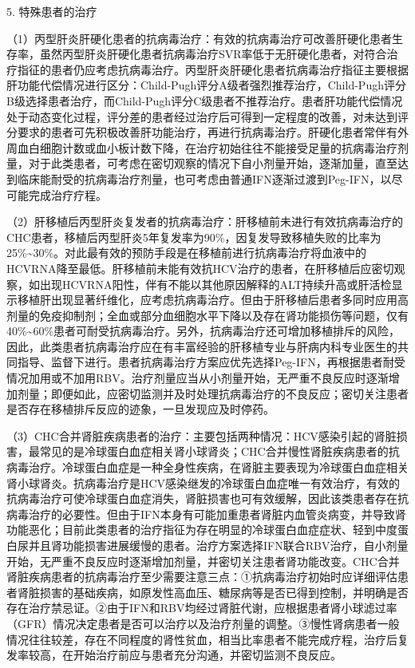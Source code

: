 5. 特殊患者的治疗

（1）丙型肝炎肝硬化患者的抗病毒治疗：有效的抗病毒治疗可改善肝硬化患者生存率，虽然丙型肝炎肝硬化患者抗病毒治疗SVR率低于无肝硬化患者，对符合治疗指征的患者仍应考虑抗病毒治疗。丙型肝炎肝硬化患者抗病毒治疗指征主要根据肝功能代偿情况进行区分：Child-Pugh评分A级者强烈推荐治疗，Child-Pugh评分B级选择患者治疗，而Child-Pugh评分C级患者不推荐治疗。患者肝功能代偿情况处于动态变化过程，评分差的患者经过治疗后可得到一定程度的改善，对未达到评分要求的患者可先积极改善肝功能治疗，再进行抗病毒治疗。肝硬化患者常伴有外周血白细胞计数或血小板计数下降，在治疗初始往往不能接受足量的抗病毒治疗剂量，对于此类患者，可考虑在密切观察的情况下自小剂量开始，逐渐加量，直至达到临床能耐受的抗病毒治疗剂量，也可考虑由普通IFN逐渐过渡到Peg-IFN，以尽可能完成治疗疗程。

（2）肝移植后丙型肝炎复发者的抗病毒治疗：肝移植前未进行有效抗病毒治疗的CHC患者，移植后丙型肝炎5年复发率为90\%，因复发导致移植失败的比率为25\%\textasciitilde{}30\%。对此最有效的预防手段是在移植前进行抗病毒治疗将血液中的HCVRNA降至最低。肝移植前未能有效抗HCV治疗的患者，在肝移植后应密切观察，如出现HCVRNA阳性，伴有不能以其他原因解释的ALT持续升高或肝活检显示移植肝出现显著纤维化，应考虑抗病毒治疗。但由于肝移植后患者多同时应用高剂量的免疫抑制剂；全血或部分血细胞水平下降以及存在肾功能损伤等问题，仅有40\%\textasciitilde{}60\%患者可耐受抗病毒治疗。另外，抗病毒治疗还可增加移植排斥的风险，因此，此类患者抗病毒治疗应在有丰富经验的肝移植专业与肝病内科专业医生的共同指导、监督下进行。患者抗病毒治疗方案应优先选择Peg-IFN，再根据患者耐受情况加用或不加用RBV。治疗剂量应当从小剂量开始，无严重不良反应时逐渐增加剂量；即便如此，应密切监测并及时处理抗病毒治疗的不良反应；密切关注患者是否存在移植排斥反应的迹象，一旦发现应及时停药。

（3）CHC合并肾脏疾病患者的治疗：主要包括两种情况：HCV感染引起的肾脏损害，最常见的是冷球蛋白血症相关肾小球肾炎；CHC合并慢性肾脏疾病患者的抗病毒治疗。冷球蛋白血症是一种全身性疾病，在肾脏主要表现为冷球蛋白血症相关肾小球肾炎。抗病毒治疗是HCV感染继发的冷球蛋白血症唯一有效治疗，有效的抗病毒治疗可使冷球蛋白血症消失，肾脏损害也可有效缓解，因此该类患者存在抗病毒治疗的必要性。但由于IFN本身有可能加重患者肾脏内血管炎病变，并导致肾功能恶化；目前此类患者的治疗指征为存在明显的冷球蛋白血症症状、轻到中度蛋白尿并且肾功能损害进展缓慢的患者。治疗方案选择IFN联合RBV治疗，自小剂量开始，无严重不良反应时逐渐增加剂量，并密切关注患者肾功能改变。CHC合并肾脏疾病患者的抗病毒治疗至少需要注意三点：①抗病毒治疗初始时应详细评估患者肾脏损害的基础疾病，如原发性高血压、糖尿病等是否已得到控制，并明确是否存在治疗禁忌证。②由于IFN和RBV均经过肾脏代谢，应根据患者肾小球滤过率（GFR）情况决定患者是否可以治疗以及治疗剂量的调整。③慢性肾病患者一般情况往往较差，存在不同程度的肾性贫血，相当比率患者不能完成疗程，治疗后复发率较高，在开始治疗前应与患者充分沟通，并密切监测不良反应。

